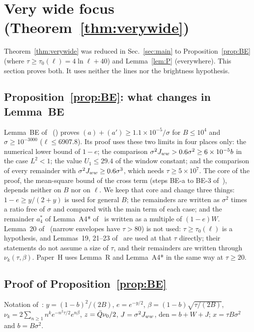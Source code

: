 \section{Very wide focus (Theorem~\ref{thm:verywide})}
\label{sec:verywide}

Theorem~\ref{thm:verywide} was reduced in Sec.~\ref{sec:main} to Proposition~\ref{prop:BE} (where $\tau\ge\tau_0(\ell)=4\ln\ell+40$) and Lemma~\ref{lem:P} (everywhere).
This section proves both.
It uses neither the lines nor the brightness hypothesis.

\subsection{Proposition~\ref{prop:BE}: what changes in Lemma~BE}

Lemma~BE of~\cite{H} () proves $(a)+(a')\ge1.1\times10^{-5}/\sigma$ for $B\le10^4$ and $\sigma\ge10^{-3000}$ ($\ell\le6907.8$).
Its proof uses these two limits in four places only:
the numerical lower bound of $1-e$;
the comparison $\sigma^2J_{ww}>0.6\sigma^2\ge6\times10^{-5}b$ in the case $L^2<1$;
the value $U_1\le29.4$ of the window constant;
and the comparison of every remainder with $\sigma^2J_{ww}\ge0.6\sigma^3$, which needs $\tau\ge5\times10^7$.
The core of the proof, the mean-square bound of the cross term (steps BE-a to BE-3 of~\cite{H}), depends neither on $B$ nor on $\ell$.
We keep that core and change three things:
$1-e\ge y/(2+y)$ is used for general $B$;
the remainders are written as $\sigma^2$ times a ratio free of $\sigma$ and compared with the main term of each case;
and the remainder $a_4^*$ of Lemma~A4* of~\cite{H} is written as a multiple of $(1-e)W$.
Lemma~20 of~\cite{F} (narrow envelopes have $\tau>80$) is not used: $\tau\ge\tau_0(\ell)$ is a hypothesis, and Lemmas~19, 21--23 of~\cite{F} are used at that $\tau$ directly; their statements do not assume a size of $\tau$, and their remainders are written through $\nu_k(\tau,\beta)$.
Paper~H uses Lemma~R and Lemma~A4* in the same way at $\tau\ge20$.

\subsection{Proof of Proposition~\ref{prop:BE}}

Notation of~\cite{F,H}: $y=(1-b)^2/(2B)$, $e=e^{-y/2}$, $\beta=(1-b)\sqrt{\tau/(2B)}$, $\nu_k=2\sum_{n\ge1}n^ke^{-n^2\tau/2}e^{n\beta}$, $z=\bar Q\nu_0/2$, $J=\sigma^2J_{ww}$, $\mathrm{den}=b+W+J$; $x=\tau B\sigma^2$ and $b=B\sigma^2$.

